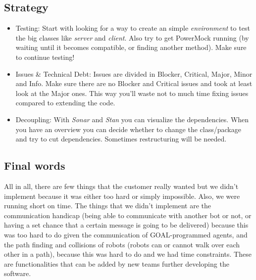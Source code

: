 \documentclass[]{article}
\begin{document}
\subsection*{Strategy}
\begin{itemize}
	\item Testing: Start with looking for a way to create an simple \emph{environment} to test the big classes like \emph{server} and \emph{client}. Also try to get PowerMock running (by waiting until it becomes compatible, or finding another method). Make sure to continue testing! 
	\item Issues \& Technical Debt: Issues are divided in Blocker, Critical, Major, Minor and Info. Make sure there are no Blocker and Critical issues and took at least look at the Major ones. This way you'll waste not to much time fixing issues compared to extending the code.  
	\item Decoupling: With \emph{Sonar} and \emph{Stan} you can visualize the dependencies. When you have an overview you can decide whether to change the class/package and try to cut dependencies. Sometimes restructuring will be needed. 
\end{itemize}
\subsection{Final words}
All in all, there are few things that the customer really wanted but we didn't implement because it was either too hard or simply impossible. Also, we were running short on time. The things that we didn't implement are the communication handicap (being able to communicate with another bot or not, or having a set chance that a certain message is going to be delivered) because this was too hard to do given the communication of GOAL-programmed agents, and the path finding and collisions of robots (robots can or cannot walk over each other in a path), because this was hard to do and we had time constraints. These are functionalities that can be added by new teams further developing the software.
\end{document}
